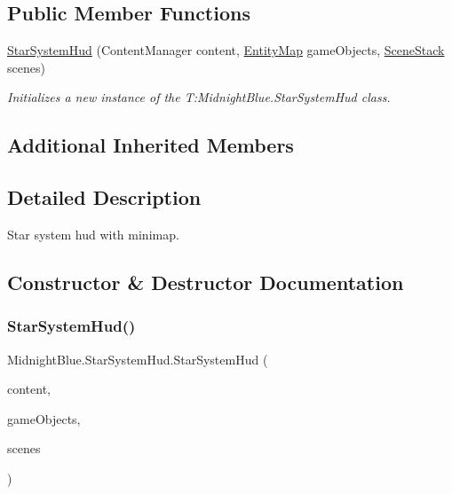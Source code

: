 \subsection*{Public Member Functions}
\begin{DoxyCompactItemize}
\item 
\hyperlink{class_midnight_blue_1_1_star_system_hud_acfe0b74ff1b0013956511de5ab3d38b3}{Star\+System\+Hud} (Content\+Manager content, \hyperlink{class_m_b2_d_1_1_entity_component_1_1_entity_map}{Entity\+Map} game\+Objects, \hyperlink{class_m_b2_d_1_1_scenes_1_1_scene_stack}{Scene\+Stack} scenes)
\begin{DoxyCompactList}\small\item\em Initializes a new instance of the T\+:\+Midnight\+Blue.\+Star\+System\+Hud class. \end{DoxyCompactList}\end{DoxyCompactItemize}
\subsection*{Additional Inherited Members}


\subsection{Detailed Description}
Star system hud with minimap. 



\subsection{Constructor \& Destructor Documentation}
\hypertarget{class_midnight_blue_1_1_star_system_hud_acfe0b74ff1b0013956511de5ab3d38b3}{}\label{class_midnight_blue_1_1_star_system_hud_acfe0b74ff1b0013956511de5ab3d38b3} 
\subsubsection{\texorpdfstring{Star\+System\+Hud()}{StarSystemHud()}}
{\footnotesize\ttfamily Midnight\+Blue.\+Star\+System\+Hud.\+Star\+System\+Hud (\begin{DoxyParamCaption}\item[{Content\+Manager}]{content,  }\item[{\hyperlink{class_m_b2_d_1_1_entity_component_1_1_entity_map}{Entity\+Map}}]{game\+Objects,  }\item[{\hyperlink{class_m_b2_d_1_1_scenes_1_1_scene_stack}{Scene\+Stack}}]{scenes }\end{DoxyParamCaption})\hspace{0.3cm}{\ttfamily [inline]}}



